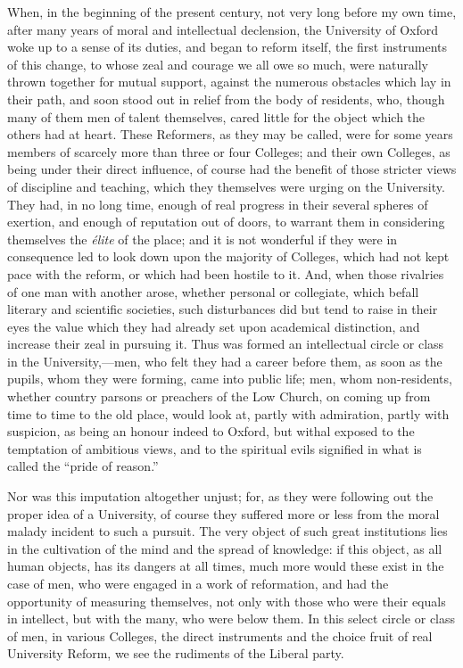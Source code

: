 When, in the beginning of the present century, not very long before
my own time, after many years of moral and intellectual declension, the
University of Oxford woke up to a sense of its duties, and began to
reform itself, the first instruments of this change, to whose zeal and
courage we all owe so much, were naturally thrown together for mutual
support, against the numerous obstacles which lay in their path, and
soon stood out in relief from the body of residents, who, though many of
them men of talent themselves, cared little for the object which the
others had at heart. These Reformers, as they may be called, were for
some years members of scarcely more than three or four Colleges; and
their own Colleges, as being under their direct influence, of course had
the benefit of those stricter views of discipline and teaching, which
they themselves were urging on the University. They had, in no long
time, enough of real progress in their several spheres of exertion, and
enough of reputation out of doors, to warrant them in considering
themselves the \emph{élite} of the place; and it is not wonderful if
they were in consequence led to look down upon the majority of Colleges,
which had not kept pace with the reform, or which had been hostile to
it. And, when those rivalries of one man with another arose, whether
personal or collegiate, which befall literary and scientific societies,
such disturbances did but tend to raise in their eyes the value which
they had already set upon academical distinction, and increase their
zeal in pursuing it. Thus was formed an intellectual circle or class in
the University,—men, who felt they had a career before them, as
soon as the pupils, whom they were forming, came into public life; men,
whom non-residents, whether country parsons or preachers of the Low
Church, on coming up from time to time to the old place, would look at,
partly with admiration, partly with suspicion, as being an honour indeed
to Oxford, but withal exposed to the temptation of ambitious views, and
to the spiritual evils signified in what is called the ``pride of
reason.''

Nor was this imputation altogether unjust; for, as they were
following out the proper idea of a University, of course they suffered
more or less from the moral malady incident to such a pursuit. The very
object of such great institutions lies in the cultivation of the mind
and the spread of knowledge: if this object, as all human objects, has
its dangers at all times, much more would these exist in the case of
men, who were engaged in a work of reformation, and had the opportunity
of measuring themselves, not only with those who were their equals in
intellect, but with the many, who were below them. In this select circle
or class of men, in various Colleges, the direct instruments and the
choice fruit of real University Reform, we see the rudiments of the
Liberal party.

